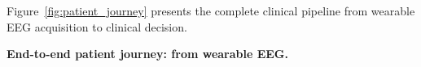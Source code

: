 \noindent Figure~\ref{fig:patient_journey} presents the complete clinical pipeline from wearable EEG acquisition to clinical decision.



\noindent\textbf{End-to-end patient journey: from wearable EEG.}

